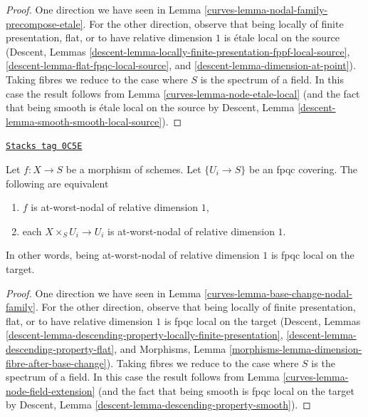 \begin{proof}

One direction we have seen in Lemma \ref{curves-lemma-nodal-family-precompose-etale}.
For the other direction, observe that being locally of finite
presentation, flat, or to have relative dimension $1$
is \'etale local on the source
(Descent, Lemmas
\ref{descent-lemma-locally-finite-presentation-fppf-local-source},
\ref{descent-lemma-flat-fpqc-local-source}, and
\ref{descent-lemma-dimension-at-point}). Taking fibres we reduce
to the case where $S$ is the spectrum of a field. In this case the
result follows from Lemma \ref{curves-lemma-node-etale-local}
(and the fact that being smooth is \'etale local on the source by
Descent, Lemma \ref{descent-lemma-smooth-smooth-local-source}).
\end{proof}

\begin{lemma}
\label{curves-lemma-nodal-family-fpqc-local-target}
\href{https://stacks.math.columbia.edu/tag/0C5E}{\texttt{Stacks tag 0C5E}}

Let $f : X \to S$ be a morphism of schemes. Let $\{U_i \to S\}$
be an fpqc covering. The following are equivalent
\begin{enumerate}
\item $f$ is at-worst-nodal of relative dimension $1$,
\item each $X \times_S U_i \to U_i$ is at-worst-nodal of relative
dimension $1$.
\end{enumerate}
In other words, being at-worst-nodal of relative dimension $1$
is fpqc local on the target.
\end{lemma}

\begin{proof}

One direction we have seen in Lemma \ref{curves-lemma-base-change-nodal-family}.
For the other direction, observe that being locally of finite
presentation, flat, or to have relative dimension $1$
is fpqc local on the target
(Descent, Lemmas
\ref{descent-lemma-descending-property-locally-finite-presentation},
\ref{descent-lemma-descending-property-flat}, and
Morphisms, Lemma \ref{morphisms-lemma-dimension-fibre-after-base-change}).
Taking fibres we reduce
to the case where $S$ is the spectrum of a field. In this case the
result follows from Lemma \ref{curves-lemma-node-field-extension}
(and the fact that being smooth is fpqc local on the target by
Descent, Lemma \ref{descent-lemma-descending-property-smooth}).
\end{proof}

